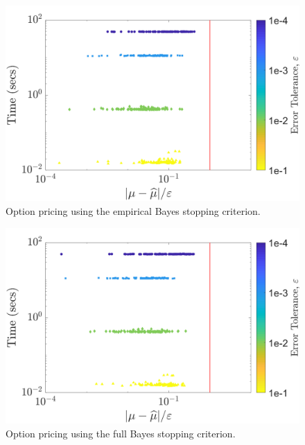 \documentclass[twocolumn]{svjour3}          %
\begin{document}
\begin{figure}
	\centering
	\includegraphics[width=0.95\linewidth]{"optPrice_guaranteed_time_MLE_Baker_d12_r1_2018-Sep-6"}
	\caption[Option pricing Guaranteed: MLE]{Option pricing using the empirical Bayes stopping criterion.}
	\label{fig:optprice-guaranteed-MLE}
\end{figure}
\begin{figure}
	\centering
	\includegraphics[width=0.95\linewidth]{"optPrice_guaranteed_time_full_Baker_d12_r1_2018-Sep-6"}
	\caption[OptPrice guaranteed : FB]{Option pricing using the full Bayes stopping criterion.}
	\label{fig:optprice-guaranteed-FB}
\end{figure}
\end{document}

